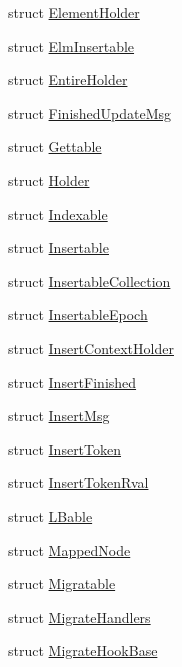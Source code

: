 \begin{DoxyCompactItemize}
struct \hyperlink{structvt_1_1vrt_1_1collection_1_1_element_holder}{Element\+Holder}
\item 
struct \hyperlink{structvt_1_1vrt_1_1collection_1_1_elm_insertable}{Elm\+Insertable}
\item 
struct \hyperlink{structvt_1_1vrt_1_1collection_1_1_entire_holder}{Entire\+Holder}
\item 
struct \hyperlink{structvt_1_1vrt_1_1collection_1_1_finished_update_msg}{Finished\+Update\+Msg}
\item 
struct \hyperlink{structvt_1_1vrt_1_1collection_1_1_gettable}{Gettable}
\item 
struct \hyperlink{structvt_1_1vrt_1_1collection_1_1_holder}{Holder}
\item 
struct \hyperlink{structvt_1_1vrt_1_1collection_1_1_indexable}{Indexable}
\item 
struct \hyperlink{structvt_1_1vrt_1_1collection_1_1_insertable}{Insertable}
\item 
struct \hyperlink{structvt_1_1vrt_1_1collection_1_1_insertable_collection}{Insertable\+Collection}
\item 
struct \hyperlink{structvt_1_1vrt_1_1collection_1_1_insertable_epoch}{Insertable\+Epoch}
\item 
struct \hyperlink{structvt_1_1vrt_1_1collection_1_1_insert_context_holder}{Insert\+Context\+Holder}
\item 
struct \hyperlink{structvt_1_1vrt_1_1collection_1_1_insert_finished}{Insert\+Finished}
\item 
struct \hyperlink{structvt_1_1vrt_1_1collection_1_1_insert_msg}{Insert\+Msg}
\item 
struct \hyperlink{structvt_1_1vrt_1_1collection_1_1_insert_token}{Insert\+Token}
\item 
struct \hyperlink{structvt_1_1vrt_1_1collection_1_1_insert_token_rval}{Insert\+Token\+Rval}
\item 
struct \hyperlink{structvt_1_1vrt_1_1collection_1_1_l_bable}{L\+Bable}
\item 
struct \hyperlink{structvt_1_1vrt_1_1collection_1_1_mapped_node}{Mapped\+Node}
\item 
struct \hyperlink{structvt_1_1vrt_1_1collection_1_1_migratable}{Migratable}
\item 
struct \hyperlink{structvt_1_1vrt_1_1collection_1_1_migrate_handlers}{Migrate\+Handlers}
\item 
struct \hyperlink{structvt_1_1vrt_1_1collection_1_1_migrate_hook_base}{Migrate\+Hook\+Base}
\item 

\end{DoxyCompactItemize}
